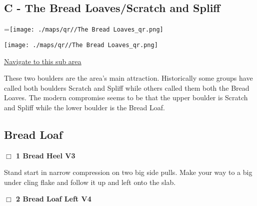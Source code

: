 	\begin{multicols}{2}

\section{C - The Bread Loaves/Scratch and Spliff}\label{sa:The Bread Loaves}
=\hbox{\texttt{[image: ./maps/qr//The Bread Loaves\_qr.png]}}%
\begin{center}
\texttt{[image: ./maps/qr//The Bread Loaves\_qr.png]}
\end{center}
\begin{center}
\underline{\textcolor{blue}{\href{http://maps.google.com/maps?q=44.43968787057463,-122.58169628966748}{Navigate to this sub area}}}
\end{center}


These two boulders are the area's main attraction. Historically some groups have called both boulders Scratch and Spliff while others called them both the Bread Loaves. The modern compromise seems to be that the upper boulder is Scratch and Spliff while the lower boulder is the Bread Loaf.\\




\needspace{10em}
\subsection*{Bread Loaf}\label{bf:Bread Loaf}




\needspace{2em}
\label{rt:Bread Heel}
\colorbox{green!20}{
\parbox{0.95\linewidth}{
\hspace{-1ex}\textbf{$\Box$
1 Bread Heel V3  
}}}
\begin{adjustwidth}{1.3em}{}			

Stand start in narrow compression on two big side pulls. Make your way to a big under cling flake and follow it up and left onto the slab.
\end{adjustwidth}




\needspace{2em}
\label{rt:Bread Loaf Left}
\colorbox{RoyalBlue!20}{
\parbox{0.95\linewidth}{
\hspace{-1ex}\textbf{$\Box$
2 Bread Loaf Left V4  
}}}
\begin{adjustwidth}{1.3em}{}			


\end{adjustwidth}
\end{multicols}
